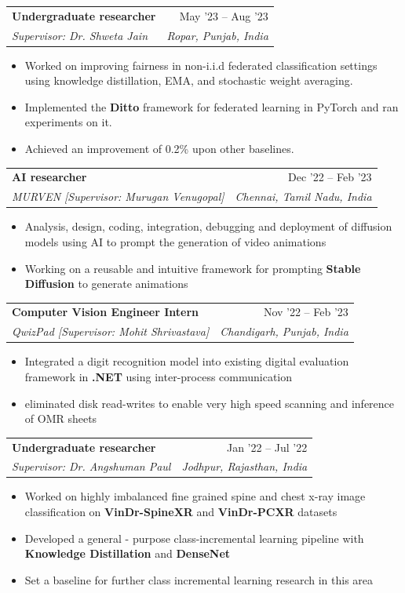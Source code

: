 \documentclass[letterpaper,11pt]{article}
\makeatletter
\newcommand{\resumeItem}[1]{
  \item{
    {#1 \vspace{-4pt}}
  }
}
\newcommand{\resumeSubheading}[4]{
  \vspace{-2pt}\item
    \begin{tabular*}{0.97\textwidth}[t]{l@{\extracolsep{\fill}}r}
      \textbf{#1} & #2 \\
      \textit{\small #3} & \textit{\small #4} \\
    \end{tabular*}\vspace{-10pt}
}
\newcommand{\resumeSubHeadingListStart}{\begin{itemize}[leftmargin=0.15in, label={}]}
\newcommand{\resumeSubHeadingListEnd}{\end{itemize}}
\newcommand{\resumeItemListStart}{\begin{itemize}}
\newcommand{\resumeItemListEnd}{\end{itemize}\vspace{-2pt}}
\makeatother
\begin{document}
\resumeSubheading
        {Undergraduate researcher}{May '23 -- Aug '23}
        {Supervisor: Dr. Shweta Jain }{Ropar, Punjab, India}
      \resumeItemListStart
        \resumeItem{Worked on improving fairness in non-i.i.d federated classification settings using knowledge distillation, EMA, and stochastic weight averaging.}
        \resumeItem{Implemented the \textbf{Ditto} framework for federated learning in PyTorch and ran experiments on it.}
        \resumeItem{Achieved an improvement of 0.2\% upon other baselines.}
    \resumeItemListEnd






\resumeSubheading
        {AI researcher}{Dec '22 -- Feb '23}
        {MURVEN [Supervisor: Murugan Venugopal]}{Chennai, Tamil Nadu, India}
      \resumeItemListStart
        \resumeItem{Analysis, design, coding, integration, debugging and deployment of diffusion models using AI to prompt the generation of video animations}
        \resumeItem{Working on a reusable and intuitive framework for prompting \textbf{Stable Diffusion} to generate animations}
    \resumeItemListEnd

\resumeSubheading
        {Computer Vision Engineer Intern}{Nov '22 -- Feb '23}
        {QwizPad [Supervisor: Mohit Shrivastava]}{Chandigarh, Punjab, India}
      \resumeItemListStart
        \resumeItem{Integrated a digit recognition model into existing digital evaluation framework in \textbf{.NET} using inter-process communication}
        \resumeItem{eliminated disk read-writes to enable very high speed scanning and inference of OMR sheets}
    \resumeItemListEnd


\resumeSubheading
        {Undergraduate researcher}{Jan '22 -- Jul '22}
        {Supervisor: Dr. Angshuman Paul }{Jodhpur, Rajasthan, India}
      \resumeItemListStart
        \resumeItem{Worked on highly imbalanced fine grained spine and chest x-ray image classification on \textbf{VinDr-SpineXR} and \textbf{VinDr-PCXR} datasets}
        \resumeItem{Developed a general - purpose class-incremental learning pipeline with \textbf{Knowledge Distillation} and \textbf{DenseNet}}
        \resumeItem{Set a baseline for further class incremental learning research in this area}
    \resumeItemListEnd
    
\end{document}
